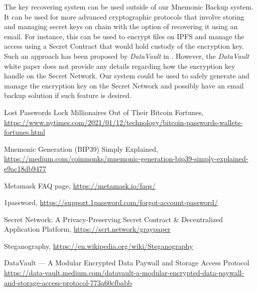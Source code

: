 \documentclass[12pt]{article}
\begin{document}
The key recovering system can be used outside of our Mnemonic Backup system. It can be used for more advanced cryptographic protocols that involve storing and managing secret keys on chain with the option of recovering it using an email. For instance, this can be used to encrypt files on IPFS and manage the access using a Secret Contract that would hold custody of the encryption key. Such an approach has been proposed by {\em DataVault} in \cite{DataVault}. However, the {\em DataVault} white paper does not provide any details regarding how the encryption key handle on the Secret Network. Our system could be used to safely generate and manage the encryption key on the Secret Network and possibly have an email backup solution if such feature is desired.  

\begin{thebibliography}{9}

 Lost Passwords Lock Millionaires Out of Their Bitcoin Fortunes, \url{https://www.nytimes.com/2021/01/12/technology/bitcoin-passwords-wallets-fortunes.html}

 Mnemonic Generation (BIP39) Simply Explained, \url{https://medium.com/coinmonks/mnemonic-generation-bip39-simply-explained-e9ac18db9477}

 Metamask FAQ page, \url{https://metamask.io/faqs/}

 1password, \url{https://support.1password.com/forgot-account-password/}

 Secret Network: A Privacy-Preserving Secret Contract \& Decentralized Application Platform, \url{https://scrt.network/graypaper}

 Steganography, \url{https://en.wikipedia.org/wiki/Steganography}

 DataVault — A Modular Encrypted Data Paywall and Storage Access Protocol \url{https://data-vault.medium.com/datavault-a-modular-encrypted-data-paywall-and-storage-access-protocol-773a60cfbabb}

\end{thebibliography}
\end{document}
